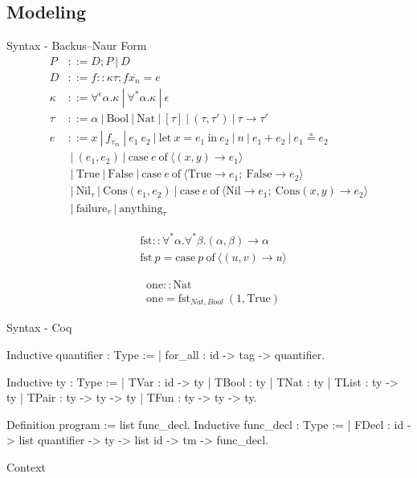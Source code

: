 \documentclass{beamer}
\begin{document}
\subsection{Modeling}
\begin{frame}{Syntax - Backus–Naur Form}
\begin{align*}
P &::= D;P \:|\:D \\
D &::= f :: \kappa \tau; f \overline{x_{n}} = e\\
\kappa &::= \forall^{\epsilon} \alpha.\kappa \:|\: \forall^{*}\alpha.\kappa \:|\: \epsilon \\
\tau &::= \alpha \:|\: \text{Bool} \:|\: \text{Nat} \:|\: [\tau] \:|\: (\tau,\tau ') \:|\: \tau \rightarrow \tau ' \\
e &::= x \:|\: f_{\overline{\tau_{m}}} \:|\: e_{1}\: e_{2} \:|\: \text{let}\: x = e_{1} \:\text{in}\: e_{2} \:|\: n \:|\: e_{1} + e_{2} \:|\: e_{1} \circeq e_{2}\\
&\:|\: (e_{1},e_{2}) \:|\: \text{case}\: e \:\text{of}\: \langle (x,y) \rightarrow e_{1}\rangle\\
&\:|\: \text{True} \:|\: \text{False} \:|\: \text{case}\: e \:\text{of}\: \langle \text{True} \rightarrow e_{1};\:\text{False} \rightarrow e_{2}\rangle\\
&\:|\: \text{Nil}_{\tau} \:|\: \text{Cons}(e_{1}, e_{2}) \:|\: \text{case}\: e \:\text{of}\: \langle \text{Nil} \rightarrow e_{1};\:\text{Cons}(x,y) \rightarrow e_{2}\rangle\\
&\:|\: \text{failure}_{\tau} \:|\: \text{anything}_{\tau}
\end{align*}
\end{frame}
\begin{frame}
\begin{minipage}{.45 \linewidth}
	\begin{align*}
	&\text{fst}::\forall^{*}\alpha.\forall^{*}\beta.(\alpha, \beta) \rightarrow\alpha\\
	&\text{fst}\: p = \text{case}\: p\: \text{of}\: \langle(u,v) \rightarrow u\rangle
	\end{align*}
\end{minipage}
\begin{minipage}{.45 \linewidth}
	\begin{align*}
	&\text{one} :: \text{Nat}\\
	&\text{one} = \text{fst}_{Nat, Bool} ~ (1, \text{True})
	\end{align*}
\end{minipage}
\end{frame}
\begin{frame}[fragile]{Syntax - Coq}
\begin{coqcode}
Inductive quantifier : Type :=
  | for_all : id -> tag -> quantifier.
	
Inductive ty : Type :=
  | TVar  : id -> ty
  | TBool : ty
  | TNat  : ty
  | TList : ty -> ty
  | TPair : ty -> ty -> ty
  | TFun  : ty -> ty -> ty.

Definition program := list func_decl.
Inductive func_decl : Type :=
  | FDecl : id -> list quantifier ->
	ty -> list id -> tm -> func_decl.
\end{coqcode}
\end{frame}
\begin{frame}{Context}
\end{frame}
\end{document}
